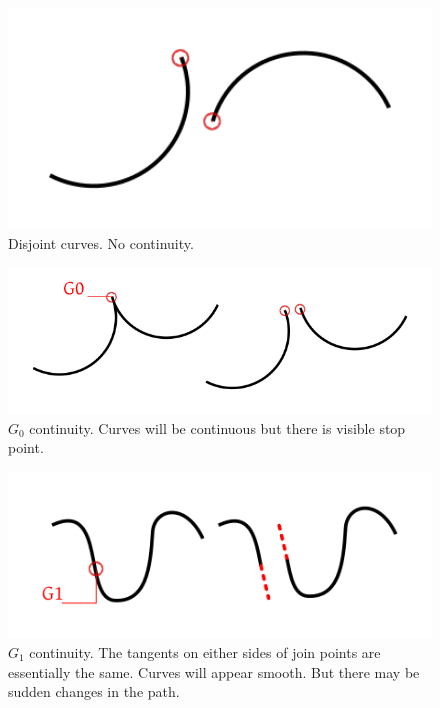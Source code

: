 \documentclass[11pt,twoside,a4paper,parskip=half]{scrartcl}
\begin{document}
\begin{figure}[h!]
	\includegraphics[width=1.0\textwidth]{images/disjoint.png}
	\caption{Disjoint curves. No continuity.}
	\label{disjoint}
\end{figure}

\begin{figure}[h!]
	\includegraphics[width=1.0\textwidth]{images/g0.png}
	\caption{$G_0$ continuity. Curves will be continuous but there is visible stop point.}
	\label{g0}
\end{figure}

\begin{figure}[h!]
	\includegraphics[width=1.0\textwidth]{images/g1.png}
	\caption{$G_1$ continuity. The tangents on either sides of join points are essentially the same. Curves will appear smooth. But there may be sudden changes in the path.}
	\label{g1}
\end{figure}
\end{document}
